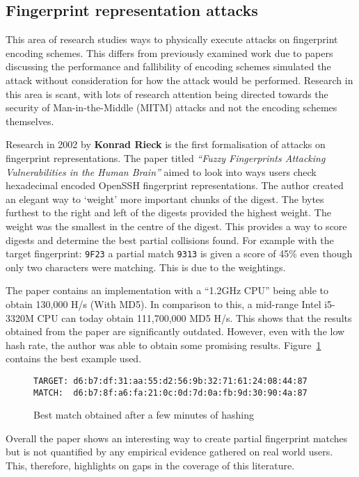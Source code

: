 \subsection{Fingerprint representation attacks}
This area of research studies ways to physically execute attacks on fingerprint encoding schemes. This differs from previously examined work due to papers discussing the performance and fallibility of encoding schemes simulated the attack without consideration for how the attack would be performed. Research in this area is scant, with lots of research attention being directed towards the security of Man-in-the-Middle (MITM) attacks and not the encoding schemes themselves.

Research in 2002 by \textbf{Konrad Rieck}\cite{rieck2002fuzzy} is the first formalisation of attacks on fingerprint representations. The paper titled \textit{``Fuzzy Fingerprints Attacking Vulnerabilities in the Human Brain''}
aimed to look into ways users check hexadecimal encoded OpenSSH fingerprint representations. The author created an elegant way to `weight' more important chunks of the digest. The bytes furthest to the right and left of the digests provided the highest weight. The weight was the smallest in the centre of the digest. This provides a way to score digests and determine the best partial collisions found. For example with the target fingerprint: \verb|9F23| a partial match \verb|9313| is given a score of 45\% even though only two characters were matching. This is due to the weightings.

The paper contains an implementation with a ``1.2GHz CPU'' being able to obtain 130,000 H/s (With MD5). In comparison to this, a mid-range Intel i5-3320M CPU can today obtain 111,700,000 MD5 H/s. This shows that the results obtained from the paper are significantly outdated. However, even with the low hash rate, the author was able to obtain some promising results. Figure~\ref{ref:fuzz} contains the best example used.

\begin{figure}[!h]
    \begin{center}
        \verb|TARGET: d6:b7:df:31:aa:55:d2:56:9b:32:71:61:24:08:44:87|
        \verb|MATCH:  d6:b7:8f:a6:fa:21:0c:0d:7d:0a:fb:9d:30:90:4a:87|
    \end{center}
    \caption{Best match obtained after a few minutes of hashing}
    \label{ref:fuzz}
\end{figure}

Overall the paper shows an interesting way to create partial fingerprint matches but is not quantified by any empirical evidence gathered on real world users. This, therefore, highlights on gaps in the coverage of this literature.

